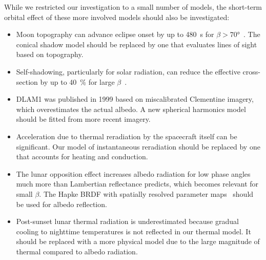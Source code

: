 While we restricted our investigation to a small number of models, the short-term orbital effect of these more involved models should also be investigated:
\begin{itemize}
    \item Moon topography can advance eclipse onset by up to \qty{480}{\s} for $\beta > \ang{70}$~\cite{Mazarico2018}. The conical shadow model should be replaced by one that evaluates lines of sight based on topography.
    \item Self-shadowing, particularly for solar radiation, can reduce the effective cross-section by up to \qty{40}{\percent} for large $\beta$~\cite{Mazarico2018}.
    \item \gls{DLAM1} was published in 1999 based on miscalibrated Clementine imagery, which overestimates the actual albedo. A new spherical harmonics model should be fitted from more recent imagery.
    \item Acceleration due to thermal reradiation by the spacecraft itself can be significant. Our model of instantaneous reradiation should be replaced by one that accounts for heating and conduction.
    \item The lunar opposition effect increases albedo radiation for low phase angles much more than Lambertian reflectance predicts, which becomes relevant for small $\beta$. The Hapke \gls{BRDF} with spatially resolved parameter maps~\cite{Sato2014} should be used for albedo reflection.
    \item Post-sunset lunar thermal radiation is underestimated because gradual cooling to nighttime temperatures is not reflected in our thermal model. It should be replaced with a more physical model due to the large magnitude of thermal compared to albedo radiation.
\end{itemize}



\FloatBarrier

